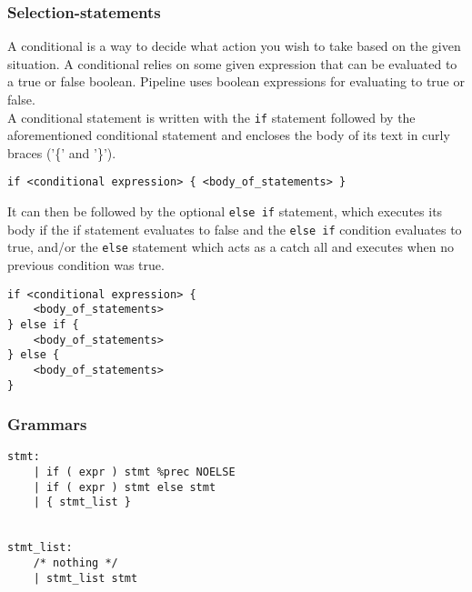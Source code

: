 \documentclass[./Report_main.tex]{subfiles}
\begin{document}
\subsubsection{Selection-statements}
A conditional is a way to decide what action you wish to take based on the given situation. A conditional relies on some given expression that can be evaluated to a true or false boolean. Pipeline uses boolean expressions for evaluating to true or false.\\
A conditional statement is written with the \texttt{if} statement followed by the aforementioned conditional statement and encloses the body of its text in curly braces ('\{' and '\}').
\begin{lstlisting}
if <conditional expression> { <body_of_statements> }
\end{lstlisting}
It can then be followed by the optional \texttt{else if} statement, which executes its body if the if statement evaluates to false and the \texttt{else if} condition evaluates to true, and/or the \texttt{else} statement which acts as a catch all and executes when no previous condition was true.
\begin{lstlisting}
if <conditional expression> {
	<body_of_statements>
} else if {
	<body_of_statements>
} else {
	<body_of_statements>
}
\end{lstlisting}
\subsubsection{Grammars}
\begin{lstlisting}
stmt:
    | if ( expr ) stmt %prec NOELSE
    | if ( expr ) stmt else stmt
    | { stmt_list }


stmt_list:
    /* nothing */  
    | stmt_list stmt
\end{lstlisting}
\end{document}
